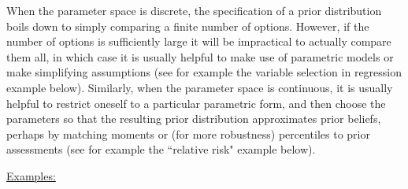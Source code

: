 \documentclass[12pt]{article}
\begin{document}
When the parameter space is discrete, the specification of a prior distribution boils down to simply comparing a finite number of options.
However, if the number of options is sufficiently
large it will be impractical to actually compare them all, in which case it is usually helpful to make use of parametric models or make simplifying assumptions (see for example the variable selection in regression example below). Similarly,
when the parameter space is continuous, it is usually helpful to restrict oneself to a particular parametric form, and then choose the parameters 
so that the resulting prior distribution approximates prior beliefs, perhaps by
  matching moments or (for more robustness) percentiles to prior assessments (see for example the ``relative risk" example below). 

\underline{Examples:}
  
\end{document}
